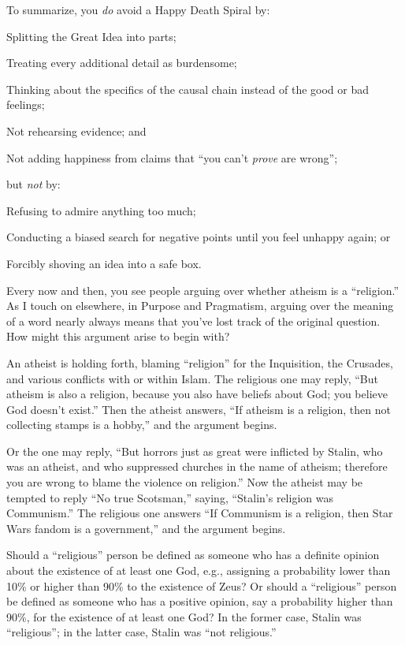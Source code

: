 {
 To summarize, you \textit{do} avoid a Happy Death Spiral by:}

{
 Splitting the Great Idea into parts;}

{
 Treating every additional detail as burdensome;}

{
 Thinking about the specifics of the causal chain instead of the
good or bad feelings;}

{
 Not rehearsing evidence; and}

{
 Not adding happiness from claims that ``you
can't \textit{prove} are wrong'';}

{
 but \textit{not} by:}

{
 Refusing to admire anything too much;}

{
 Conducting a biased search for negative points until you feel
unhappy again; or}

{
 Forcibly shoving an idea into a safe box.}

\myendsectiontext


{
 Every now and then, you see people arguing over whether atheism is
a ``religion.'' As I touch on
elsewhere, in Purpose and Pragmatism, arguing over the meaning of a
word nearly always means that you've lost track of the
original question. How might this argument arise to begin with? }

{
 An atheist is holding forth, blaming
``religion'' for the Inquisition,
the Crusades, and various conflicts with or within Islam. The religious
one may reply, ``But atheism is also a religion,
because you also have beliefs about God; you believe God
doesn't exist.'' Then the atheist
answers, ``If atheism is a religion, then not
collecting stamps is a hobby,'' and the argument
begins.}

{
 Or the one may reply, ``But horrors just as great
were inflicted by Stalin, who was an atheist, and who suppressed
churches in the name of atheism; therefore you are wrong to blame the
violence on religion.'' Now the atheist may be
tempted to reply ``No true
Scotsman,'' saying,
``Stalin's religion was
Communism.'' The religious one answers
``If Communism is a religion, then Star Wars fandom is
a government,'' and the argument begins.}

{
 Should a ``religious'' person
be defined as someone who has a definite opinion about the existence of
at least one God, e.g., assigning a probability lower than 10\% or
higher than 90\% to the existence of Zeus? Or should a
``religious'' person be defined as
someone who has a positive opinion, say a probability higher than 90\%,
for the existence of at least one God? In the former case, Stalin was
``religious''; in the latter case,
Stalin was ``not religious.''}

